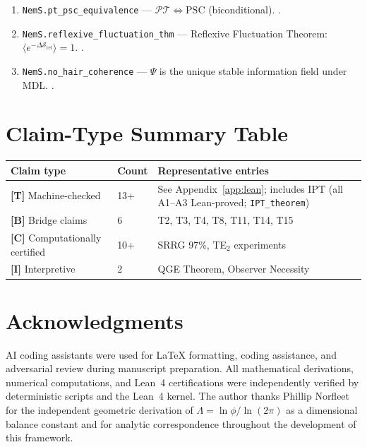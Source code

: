 \documentclass[11pt]{article}
\newcommand{\PT}{\mathcal{P}\mathcal{T}}
\newcommand{\PSC}{\text{PSC}}
\newcommand{\tagT}{\textbf{[T]}}
\newcommand{\tagB}{\textbf{[B]}}
\newcommand{\tagC}{\textbf{[C]}}
\newcommand{\tagI}{\textbf{[I]}}
\theoremstyle{plain}
\theoremstyle{definition}
\theoremstyle{remark}
\begin{document}
\begin{enumerate}[leftmargin=0pt,itemindent=0pt,label=\arabic*.,itemsep=3pt]
\item \texttt{NemS.pt\_psc\_equivalence} ---
  $\PT \Leftrightarrow \PSC$ (biconditional). \cite{SpivackNEMSLean}.

\item \texttt{NemS.reflexive\_fluctuation\_thm} ---
  Reflexive Fluctuation Theorem: $\langle e^{-\Delta\mathcal{S}_\mathrm{ref}}\rangle = 1$. \cite{SpivackNEMSLean}.

\item \texttt{NemS.no\_hair\_coherence} ---
  $\Psi$ is the unique stable information field under MDL. \cite{SpivackNEMSLean}.
\end{enumerate}

\section{Claim-Type Summary Table}
\label{app:claimtypes}

\begin{center}
\small
\begin{tabular}{@{}p{3.2cm}p{1.8cm}p{7cm}@{}}
\toprule
Claim type & Count & Representative entries \\
\midrule
\tagT{} Machine-checked & 13+ & See Appendix~\ref{app:lean}; includes IPT (all A1--A3 Lean-proved; \texttt{IPT\_theorem}) \\
\tagB{} Bridge claims & 6 & T2, T3, T4, T8, T11, T14, T15 \\
\tagC{} Computationally certified & 10+ & SRRG 97\%, TE$_2$ experiments \\
\tagI{} Interpretive & 2 & QGE Theorem, Observer Necessity \\
\bottomrule
\end{tabular}
\end{center}

\section*{Acknowledgments}

AI coding assistants were used for LaTeX formatting, coding assistance, and adversarial review during manuscript preparation. All mathematical derivations, numerical computations, and Lean~4 certifications were independently verified by deterministic scripts and the Lean~4 kernel.
The author thanks Phillip Norfleet for the independent geometric derivation
of $\Lambda = \ln\phi/\ln(2\pi)$ as a dimensional balance constant
and for analytic correspondence throughout the development of this framework.
\end{document}
